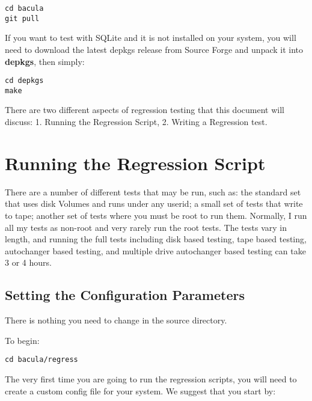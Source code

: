 \footnotesize
\begin{verbatim}
cd bacula
git pull
\end{verbatim}
\normalsize

If you want to test with SQLite and it is not installed on your system,
you will need to download the latest depkgs release from Source Forge and
unpack it into {\bf depkgs}, then simply:

\footnotesize
\begin{verbatim}
cd depkgs
make
\end{verbatim}
\normalsize


There are two different aspects of regression testing that this document will
discuss: 1. Running the Regression Script, 2. Writing a Regression test.

\section{Running the Regression Script}

There are a number of different tests that may be run, such as: the standard
set that uses disk Volumes and runs under any userid; a small set of tests
that write to tape; another set of tests where you must be root to run them.
Normally, I run all my tests as non-root and very rarely run the root
tests.  The tests vary in length, and running the full tests including disk
based testing, tape based testing, autochanger based testing, and multiple
drive autochanger based testing can take 3 or 4 hours.

\subsection{Setting the Configuration Parameters}

There is nothing you need to change in the source directory.

To begin:

\footnotesize
\begin{verbatim}
cd bacula/regress
\end{verbatim}
\normalsize


The
very first time you are going to run the regression scripts, you will
need to create a custom config file for your system.
We suggest that you start by:

